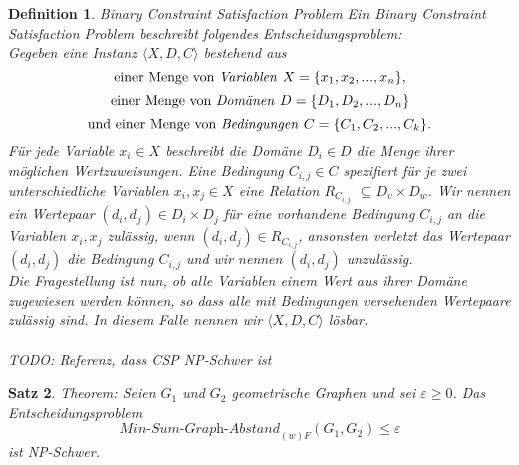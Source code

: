 \documentclass[a4paper, 12pt, twoside]{article}
\theoremstyle{Format1} %
\newtheorem{Def}{Definition}[section]       %
\newtheorem{Satz}[Def]{Satz}                %
\begin{document}
\begin{Def}
	Binary Constraint Satisfaction Problem
	Ein \textit{Binary Constraint Satisfaction Problem} beschreibt folgendes Entscheidungsproblem:
	\\
	Gegeben eine Instanz $\langle X,D,C \rangle$ bestehend aus
	$$ \text{einer Menge von \textit{Variablen }}X = \{x_1, x_2, ..., x_n\},$$
	$$ \text{einer Menge von \textit{Domänen }}D = \{D_1, D_2, ..., D_n\} $$
	$$ \text{und einer Menge von \textit{Bedingungen }}C = \{C_1, C_2, ..., C_k\}. $$
	Für jede Variable $ x_i \in X$ beschreibt die Domäne $ D_i \in D$ die Menge ihrer möglichen Wertzuweisungen.
	Eine Bedingung $C_{i,j} \in C$ spezifiert für je zwei unterschiedliche Variablen $x_i, x_j \in X$ eine Relation $R_{C_{i,j}}$ $\subseteq D_v \times D_w$.
	Wir nennen ein Wertepaar $(d_i, d_j) \in D_i \times D_j$ für eine vorhandene Bedingung $C_{i,j}$ an die Variablen $x_i,x_j$ \textit{zulässig}, wenn $(d_i,d_j) \in R_{C_{i,j}}$,
	ansonsten \textit{verletzt} das Wertepaar $(d_i, d_j)$ die Bedingung $C_{i,j}$ und wir nennen $(d_i,d_j)$ \textit{unzulässig}.
	\\
	Die Fragestellung ist nun, ob alle Variablen einem Wert aus ihrer Domäne zugewiesen werden können, so dass alle mit Bedingungen versehenden Wertepaare zulässig sind.
	In diesem Falle nennen wir $\langle X,D,C \rangle$ \textit{lösbar}.
	\\
	\\
	TODO: Referenz, dass CSP NP-Schwer ist
\end{Def}

\begin{Satz}
	Theorem: Seien $G_1$ und $G_2$ geometrische Graphen und sei $\varepsilon \geq 0$.
	Das Entscheidungsproblem $$ \textit{Min-Sum-Graph-Abstand}_{(w)F}(G_1, G_2) \leq  \varepsilon $$ ist NP-Schwer.
\end{Satz}
\end{document}
